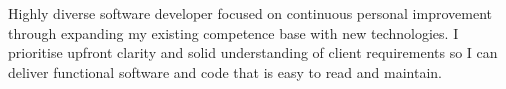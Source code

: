 %
%
%
\par{
  Highly diverse software developer focused on continuous personal improvement
  through expanding my existing competence base with new technologies. I
  prioritise upfront clarity and solid understanding of client requirements so
  I can deliver functional software and code that is easy to read and maintain.
}